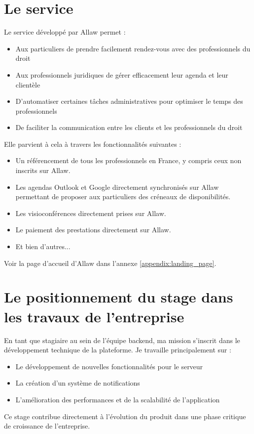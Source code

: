 \section{Le service}
Le service développé par Allaw permet :
\begin{itemize}
    \item Aux particuliers de prendre facilement rendez-vous avec des professionnels du droit
    \item Aux professionnels juridiques de gérer efficacement leur agenda et leur clientèle
    \item D'automatiser certaines tâches administratives pour optimiser le temps des professionnels
    \item De faciliter la communication entre les clients et les professionnels du droit
\end{itemize}

Elle parvient à cela à travers les fonctionnalités suivantes :

\begin{itemize}
    \item Un référencement de tous les professionnels en France, y compris ceux non inscrits sur Allaw.
    \item Les agendas Outlook et Google directement synchronisés sur Allaw permettant de proposer aux particuliers des créneaux de disponibilités.
    \item Les visioconférences directement prises sur Allaw.
    \item Le paiement des prestations directement sur Allaw.
    \item Et bien d'autres...
\end{itemize}

Voir la page d'accueil d'Allaw dans l'annexe \ref{appendix:landing_page}.

\section{Le positionnement du stage dans les travaux de l'entreprise} 
En tant que stagiaire au sein de l'équipe backend, ma mission s'inscrit dans le développement technique de la plateforme. Je travaille principalement sur :
\begin{itemize}
    \item Le développement de nouvelles fonctionnalités pour le serveur
    \item La création d'un système de notifications
    \item L'amélioration des performances et de la scalabilité de l'application
\end{itemize}
Ce stage contribue directement à l'évolution du produit dans une phase critique
de croissance de l'entreprise.

